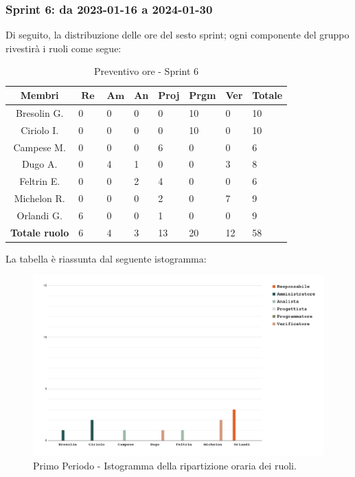 \documentclass[10pt, a4paper]{article}
\begin{document}
{{{{{{{{{{{{{\subsubsection{Sprint 6: da 2023-01-16 a 2024-01-30}
Di seguito, la distribuzione delle ore del sesto sprint; ogni componente del gruppo rivestirà i ruoli come segue:
\begin{table}[H]
\begin{tabularx}{\textwidth}{c|X|X|X|X|X|X|X}
        \textbf{Membri} & $\operatorname{\textbf{Re}}$ & $\mathrm{\textbf{Am}}$ & \textbf{An} & \textbf{Proj} & \textbf{Prgm} & \textbf{Ver} & \textbf{Totale} \\
        \hline Bresolin G. & 0 & 0 & 0 & 0 & \cellcolor{primarycolor}10 & 0 & 10 \\
        \hline Ciriolo I.  & 0 & 0 & 0 & 0 & \cellcolor{primarycolor}10 & 0 & 10 \\
        \hline Campese M.  & 0 & 0 & 0 & \cellcolor{primarycolor}6 & 0 & 0 & 6 \\
        \hline Dugo A.     & 0 & \cellcolor{primarycolor}4 & 1 & 0 & 0 & 3 & 8 \\
        \hline Feltrin E.  & 0 & 0 & 2 & \cellcolor{primarycolor}4 & 0 & 0 & 6 \\
        \hline Michelon R. & 0 & 0 & 0 & 2 & 0 & \cellcolor{primarycolor}7 & 9 \\
        \hline Orlandi G.  & \cellcolor{primarycolor}6 & 0 & 0 & 1 & 0 & 0 & 9 \\
        \hline
        \textbf{Totale ruolo} & 6 & 4 & 3 & 13 & 20 & 12 & 58 
    \end{tabularx}
    \caption{Preventivo ore - Sprint 6}
    \end{table}

La tabella è riassunta dal seguente istogramma:
 \begin{figure}[H]
        \centering        
        \includegraphics[width=15.5cm]{istogrammi/istogramma_6_periodo.png}
        \caption{Primo Periodo - Istogramma della ripartizione oraria dei ruoli. }
    \end{figure}


}}}}}}}}}}}}}
\end{document}
